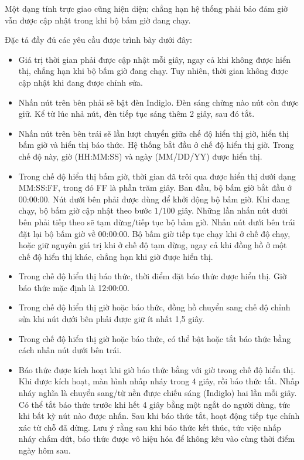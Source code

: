 
Một dạng tính trực giao cũng hiện diện; chẳng hạn hệ thống phải bảo đảm giờ vẫn được cập nhật trong khi bộ bấm giờ đang chạy.

Đặc tả đầy đủ các yêu cầu được trình bày dưới đây:
\begin{itemize}
\item Giá trị thời gian phải được cập nhật mỗi giây, ngay cả khi không được hiển thị, chẳng hạn khi bộ bấm giờ đang chạy. Tuy nhiên, thời gian không được cập nhật khi đang được chỉnh sửa.
\item Nhấn nút trên bên phải sẽ bật đèn Indiglo. Đèn sáng chừng nào nút còn được giữ. Kể từ lúc nhả nút, đèn tiếp tục sáng thêm 2 giây, sau đó tắt.
\item Nhấn nút trên bên trái sẽ lần lượt chuyển giữa chế độ hiển thị giờ, hiển thị bấm giờ và hiển thị báo thức. Hệ thống bắt đầu ở chế độ hiển thị giờ. Trong chế độ này, giờ (HH:MM:SS) và ngày (MM/DD/YY) được hiển thị.
\item Trong chế độ hiển thị bấm giờ, thời gian đã trôi qua được hiển thị dưới dạng MM:SS:FF, trong đó FF là phần trăm giây. Ban đầu, bộ bấm giờ bắt đầu ở 00:00:00. Nút dưới bên phải được dùng để khởi động bộ bấm giờ. Khi đang chạy, bộ bấm giờ cập nhật theo bước $1/100$ giây. Những lần nhấn nút dưới bên phải tiếp theo sẽ tạm dừng/tiếp tục bộ bấm giờ. Nhấn nút dưới bên trái đặt lại bộ bấm giờ về 00:00:00. Bộ bấm giờ tiếp tục chạy khi ở chế độ chạy, hoặc giữ nguyên giá trị khi ở chế độ tạm dừng, ngay cả khi đồng hồ ở một chế độ hiển thị khác, chẳng hạn khi giờ được hiển thị.
\item Trong chế độ hiển thị báo thức, thời điểm đặt báo thức được hiển thị. Giờ báo thức mặc định là 12:00:00.
\item Trong chế độ hiển thị giờ hoặc báo thức, đồng hồ chuyển sang chế độ chỉnh sửa khi nút dưới bên phải được giữ ít nhất 1,5 giây.
\item Trong chế độ hiển thị giờ hoặc báo thức, có thể bật hoặc tắt báo thức bằng cách nhấn nút dưới bên trái.
\item Báo thức được kích hoạt khi giờ báo thức bằng với giờ trong chế độ hiển thị. Khi được kích hoạt, màn hình nhấp nháy trong 4 giây, rồi báo thức tắt. Nhấp nháy nghĩa là chuyển sang/từ nền được chiếu sáng (Indiglo) hai lần mỗi giây. Có thể tắt báo thức trước khi hết 4 giây bằng một ngắt do người dùng, tức khi bất kỳ nút nào được nhấn. Sau khi báo thức tắt, hoạt động tiếp tục chính xác từ chỗ đã dừng. Lưu ý rằng sau khi báo thức kết thúc, tức việc nhấp nháy chấm dứt, báo thức được vô hiệu hóa để không kêu vào cùng thời điểm ngày hôm sau.

\end{itemize}
